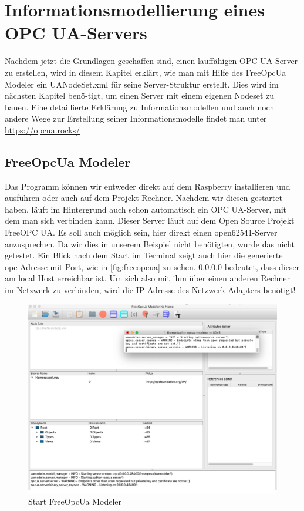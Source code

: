 \section{Informationsmodellierung eines OPC UA-Servers}
Nachdem jetzt die Grundlagen geschaffen sind, einen lauffähigen OPC UA-Server zu erstellen, wird in diesem Kapitel erklärt, wie man mit Hilfe des FreeOpcUa Modeler ein UANodeSet.xml für seine Server-Struktur erstellt. Dies wird im nächsten Kapitel benö-tigt, um einen Server mit einem eigenen Nodeset zu bauen. Eine detaillierte Erklärung zu Informationsmodellen und auch noch andere Wege zur Erstellung seiner Informationsmodelle findet man unter \hyperref[https://opcua.rocks/]{https://opcua.rocks/} 

\subsection{FreeOpcUa Modeler}
Das Programm können wir entweder direkt auf dem Raspberry installieren und ausführen oder auch auf dem Projekt-Rechner.
Nachdem wir diesen gestartet haben, läuft im Hintergrund auch schon automatisch ein OPC UA-Server, mit dem man sich verbinden kann. Dieser Server läuft auf dem Open Source Projekt FreeOPC UA. Es soll auch möglich sein, hier direkt einen open62541-Server anzusprechen. Da wir dies in unserem Beispiel nicht benötigten, wurde das nicht getestet.
Ein Blick nach dem Start im Terminal zeigt auch hier die generierte opc-Adresse mit Port, wie in \autoref{fig:freeopcua} zu sehen. 0.0.0.0 bedeutet, dass dieser am local Host erreichbar ist. Um sich also mit ihm über einen anderen Rechner im Netzwerk zu verbinden, wird die IP-Adresse des Netzwerk-Adapters benötigt!
\begin{figure}[H]
	\centering
	\includegraphics[width=1\linewidth]{abb/FreeOPCUA}
	\caption{Start FreeOpcUa Modeler}
	\label{fig:freeopcua}
\end{figure}
